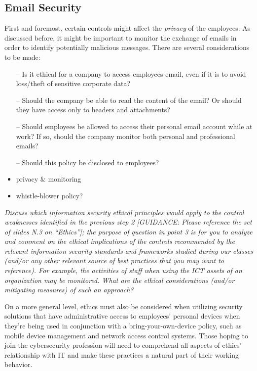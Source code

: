 \documentclass[12pt]{extarticle}
\begin{document}
	\subsection{Email Security}
	First and foremost, certain controls might affect the \textit{privacy} of the employees. As discussed before, it might be important to monitor the exchange of emails in order to identify potentially malicious messages. There are several considerations to be made:
	\begin{itemize}
		\item[--] Is it ethical for a company to access employees email, even if it is to avoid loss/theft of sensitive corporate data?
		\item[--] Should the company be able to read the content of the email? Or should they have access only to headers and attachments?
		\item[--] Should employees be allowed to access their personal email account while at work? If so, should the company monitor both personal and professional emails?
		\item[--] Should this policy be disclosed to employees? 
	\end{itemize}
	

	
	
	
	
	
	\begin{itemize}
		\item privacy \& monitoring
		\item whistle-blower policy?
		\
	\end{itemize}
	
	
	\textit{Discuss which information security ethical principles would apply to the control weaknesses identified in the previous step 2 [GUIDANCE: Please reference the set of slides N.3 on “Ethics”]; the purpose of question in point 3 is for you to analyze and comment on the ethical implications of the controls recommended by the relevant information security standards and frameworks studied during our classes (and/or any other relevant source of best practices that you may want to reference).
	For example, the activities of staff when using the ICT assets of an organization may be monitored. What are the ethical considerations (and/or mitigating measures) of such an approach?	}
	

	
	On a more general level, ethics must also be considered when utilizing security solutions that have administrative access to employees’ personal devices when they’re being used in conjunction with a bring-your-own-device policy, such as mobile device management and network access control systems. Those hoping to join the cybersecurity profession will need to comprehend all aspects of ethics’ relationship with IT and make these practices a natural part of their working behavior.
	\newpage
\end{document}
